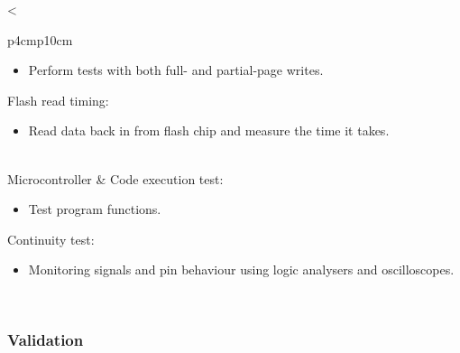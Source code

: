 \begin{longtable}{<{\raggedright}p{4cm}p{10cm}}
\begin{itemize}
    \item Perform tests with both full- and partial-page writes.
  \end{itemize}
 Flash read timing: 
  \begin{itemize}
    \item Read data back in from flash chip and measure the time it takes.
  \end{itemize} \\
\midrule
Microcontroller & Code execution test:  
  \begin{itemize}
    \item Test program functions. 
  \end{itemize} 
 Continuity test:  
 \begin{itemize}
  \item Monitoring signals and pin behaviour using logic analysers and oscilloscopes.
 \end{itemize}\\
 \bottomrule
\end{longtable}

\subsubsection{Validation}

